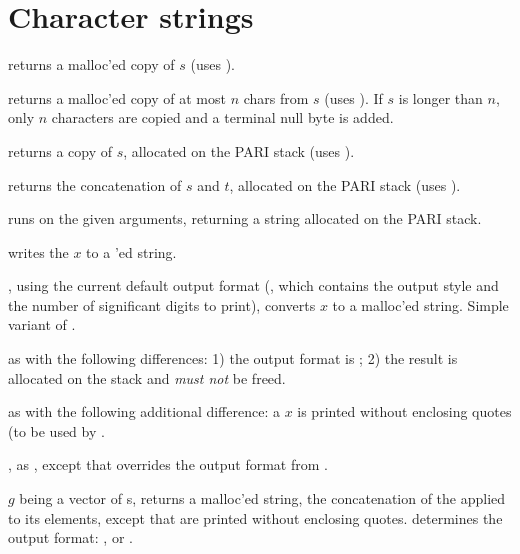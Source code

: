 \section{Character strings}


 returns a malloc'ed copy of $s$
(uses ).

 returns a malloc'ed copy of
at most $n$ chars from $s$ (uses ). If $s$ is longer than
$n$, only $n$ characters are copied and a terminal null byte is added.

 returns a copy of $s$, allocated
on the PARI stack (uses ).

 returns the
concatenation of $s$ and $t$, allocated on the PARI stack (uses
).

 runs 
on the given arguments, returning a string allocated on the PARI stack.

 writes the  $x$ to a 'ed
string.

, using the current default output format
(, which contains the output style and the number of
significant digits to print), converts $x$ to a malloc'ed string. Simple
variant of .

 as  with the following
differences: 1) the output format is ; 2) the result is allocated
on the stack and \emph{must not} be freed.

 as  with the following
additional difference: a  $x$ is printed without enclosing quotes
(to be used by .

, as , except that
 overrides the output format from .

 $g$ being a vector of s,
returns a malloc'ed string, the concatenation of the  applied
to its elements, except that  are printed without enclosing quotes.
 determines the output format: , 
or .

